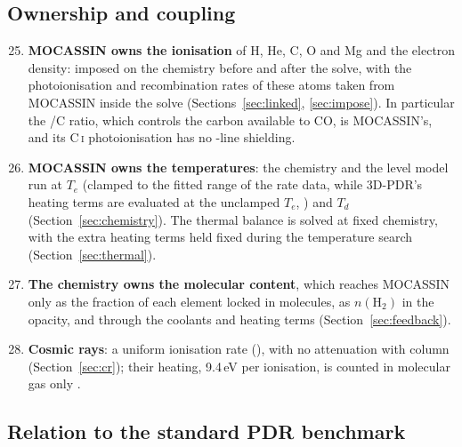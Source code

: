 \subsection{Ownership and coupling}
\begin{enumerate}\setcounter{enumi}{24}
\item \textbf{MOCASSIN owns the ionisation} of H, He, C, O and Mg and the
  electron density: imposed on the chemistry before and after the solve, with
  the photoionisation and recombination rates of these atoms taken from
  MOCASSIN inside the solve (Sections~\ref{sec:linked}, \ref{sec:impose}).
  In particular the \Cp/C ratio, which controls the carbon available to CO, is
  MOCASSIN's, and its C\,\textsc{i} photoionisation has no \Htwo-line shielding.
\item \textbf{MOCASSIN owns the temperatures}: the chemistry and the level
  model run at $T_e$ (clamped to the fitted range of the rate data, while 3D-PDR's
  heating terms are evaluated at the unclamped $T_e$, ) and $T_d$
  (Section~\ref{sec:chemistry}). The thermal balance is solved at fixed
  chemistry, with the extra heating terms held fixed during the temperature
  search (Section~\ref{sec:thermal}).
\item \textbf{The chemistry owns the molecular content}, which reaches MOCASSIN
  only as the fraction of each element locked in molecules, as $n(\mathrm{H_2})$
  in the opacity, and through the coolants and heating terms
  (Section~\ref{sec:feedback}).
\item \textbf{Cosmic rays}: a uniform ionisation rate (), with no
  attenuation with column (Section~\ref{sec:cr}); their heating, 9.4\,eV per
  \Htwo{} ionisation, is counted in molecular gas only
  \citep{TielensHollenbach1985}.
\end{enumerate}

\subsection{Relation to the standard PDR benchmark}

